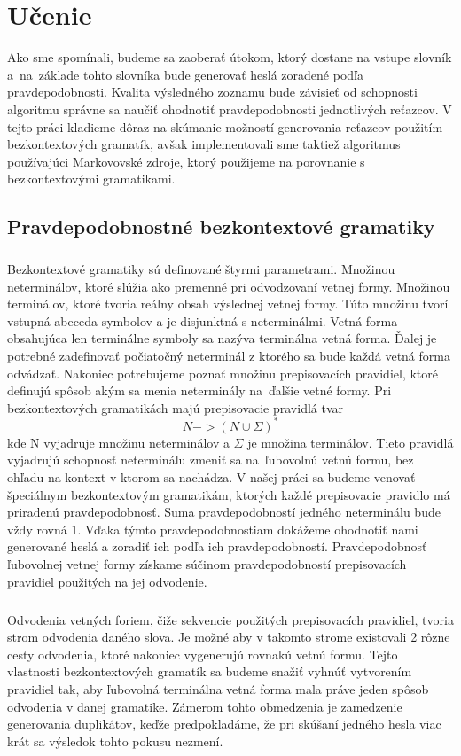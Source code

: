 \chapter{Učenie}
Ako sme spomínali, budeme sa zaoberať útokom, ktorý dostane na vstupe slovník a~na~základe tohto slovníka bude generovať heslá zoradené podľa pravdepodobnosti. Kvalita výsledného zoznamu bude závisieť od schopnosti algoritmu správne sa naučiť ohodnotiť pravdepodobnosti jednotlivých reťazcov. V tejto práci kladieme dôraz na skúmanie možností generovania reťazcov použitím bezkontextových gramatík, avšak implementovali sme taktiež algoritmus používajúci Markovovské zdroje, ktorý použijeme na porovnanie s bezkontextovými gramatikami.

\section{Pravdepodobnostné bezkontextové gramatiky}
\paragraph{}
Bezkontextové gramatiky sú definované štyrmi parametrami. Množinou neterminálov, ktoré slúžia ako premenné pri odvodzovaní vetnej formy. Množinou terminálov, ktoré tvoria reálny obsah výslednej vetnej formy. Túto množinu tvorí vstupná abeceda symbolov a je disjunktná s neterminálmi. Vetná forma obsahujúca len terminálne symboly sa nazýva terminálna vetná forma. Ďalej je potrebné zadefinovať počiatočný neterminál z ktorého sa bude každá vetná forma odvádzať. Nakoniec potrebujeme poznať množinu prepisovacích pravidiel, ktoré definujú spôsob akým sa menia neterminály na~ďalšie vetné formy. Pri bezkontextových gramatikách majú prepisovacie pravidlá tvar
\[N -> (N \cup \Sigma)^*\]
kde N vyjadruje množinu neterminálov a \(\Sigma\) je množina terminálov. Tieto pravidlá vyjadrujú schopnosť neterminálu zmeniť sa na~ľubovolnú vetnú formu, bez ohľadu na kontext v ktorom sa nachádza. V našej práci sa budeme venovať špeciálnym bezkontextovým gramatikám, ktorých každé prepisovacie pravidlo má priradenú pravdepodobnosť. Suma pravdepodobností jedného neterminálu bude vždy rovná 1. Vďaka týmto pravdepodobnostiam dokážeme ohodnotiť nami generované heslá a zoradiť ich podľa ich pravdepodobností. Pravdepodobnosť ľubovolnej vetnej formy získame súčinom pravdepodobností prepisovacích pravidiel použitých na jej odvodenie.

\paragraph{}
Odvodenia vetných foriem, čiže sekvencie použitých prepisovacích pravidiel, tvoria strom odvodenia daného slova. Je možné aby v takomto strome existovali 2 rôzne cesty odvodenia, ktoré nakoniec vygenerujú rovnakú vetnú formu. Tejto vlastnosti bezkontextových gramatík sa budeme snažiť vyhnúť vytvorením pravidiel tak, aby ľubovolná terminálna vetná forma mala práve jeden spôsob odvodenia v danej gramatike. Zámerom tohto obmedzenia je zamedzenie generovania duplikátov, keďže predpokladáme, že pri skúšaní jedného hesla viac krát sa výsledok tohto pokusu nezmení.

